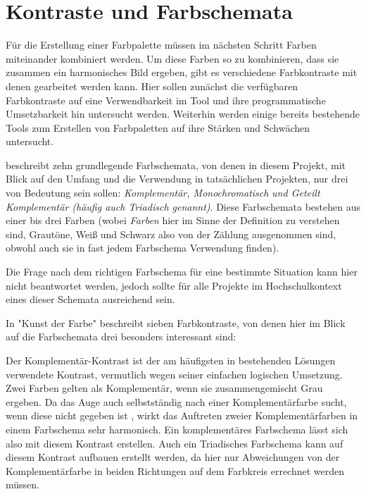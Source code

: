 
\section{Kontraste und Farbschemata}

Für die Erstellung einer Farbpalette müssen im nächsten Schritt Farben miteinander kombiniert werden. Um diese Farben so zu kombinieren, dass sie zusammen ein harmonisches Bild ergeben, gibt es verschiedene Farbkontraste mit denen gearbeitet werden kann.
Hier sollen zunächst die verfügbaren Farbkontraste auf eine Verwendbarkeit im Tool und ihre programmatische Umsetzbarkeit hin untersucht werden.
Weiterhin werden einige bereits bestehende Tools zum Erstellen von Farbpaletten auf ihre Stärken und Schwächen untersucht.

\cite[S.22]{whelan1994color} beschreibt zehn grundlegende Farbschemata, von denen in diesem Projekt, mit Blick auf den Umfang und die Verwendung in tatsächlichen Projekten, nur drei von Bedeutung sein sollen: \textit{Komplementär, Monochromatisch} \textit{und Geteilt Komplementär (häufig auch Triadisch genannt)}.
Diese Farbschemata bestehen aus einer bis drei Farben (wobei \textit{Farben} hier im Sinne der Definition zu verstehen sind, Grautöne, Weiß und Schwarz also von der Zählung ausgenommen sind, obwohl auch sie in fast jedem Farbschema Verwendung finden).

Die Frage nach dem richtigen Farbschema für eine bestimmte Situation kann hier nicht beantwortet werden, jedoch sollte für alle Projekte im Hochschulkontext eines dieser Schemata ausreichend sein.

In "Kunst der Farbe" beschreibt \cite{Itten201006} sieben Farbkontraste, von denen hier im Blick auf die Farbschemata drei besonders interessant sind:

Der Komplementär-Kontrast ist der am häufigsten in bestehenden Lösungen verwendete Kontrast, vermutlich wegen seiner einfachen logischen Umsetzung. Zwei Farben gelten als Komplementär, wenn sie zusammengemischt Grau ergeben.
Da das Auge auch selbstständig nach einer Komplementärfarbe sucht, wenn diese nicht gegeben ist \cite[S. 49]{Itten201006}, wirkt das Auftreten zweier Komplementärfarben in einem Farbschema sehr harmonisch.
Ein komplementäres Farbschema lässt sich also mit diesem Kontrast erstellen. Auch ein Triadisches Farbschema kann auf diesem Kontrast aufbauen erstellt werden, da hier nur Abweichungen von der Komplementärfarbe in beiden Richtungen auf dem Farbkreis errechnet werden müssen.

